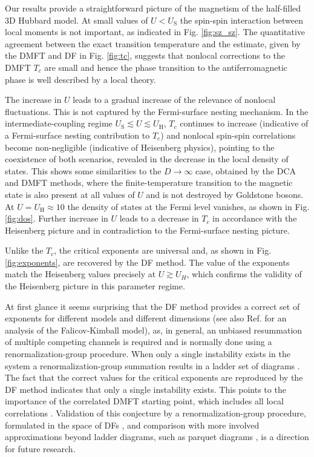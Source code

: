 \documentclass[aps,prb,twocolumn,amsmath,notitlepage,floatfix,footinbib,superscriptaddress,showpacs, showkeys]{revtex4-1}
\begin{document}
Our results provide a straightforward picture of the magnetism of the half-filled 3D Hubbard model. 
At small values of $U < U_\text{S}$ the spin-spin interaction between local moments is not important, as indicated in Fig. \ref{fig:sz_sz}. 
The quantitative agreement between the exact transition temperature and the estimate, given by the DMFT and DF in Fig. \ref{fig:tc}, suggests that nonlocal corrections to the DMFT $T_c$ are small and hence the phase transition to the antiferromagnetic phase is well described by a local theory. 

The increase in $U$ leads to a gradual increase of the relevance of nonlocal fluctuations. 
This is not captured by the Fermi-surface nesting mechanism. 
In the intermediate-coupling regime $U_\text{S} \lesssim U \lesssim U_\text{H}$, $T_c$ continues to increase (indicative of a Fermi-surface nesting contribution to $T_c$) and nonlocal spin-spin correlations become non-negligible (indicative of Heisenberg physics), pointing to the coexistence of both scenarios, revealed in the decrease in the local density of states.
This shows some similarities to the $D\to\infty$ case, obtained by the DCA \cite{Gull2008c} and DMFT \cite{Taranto2012} methods, where the finite-temperature transition to the magnetic state is also present at all values of $U$ and is not destroyed by Goldstone bosons.
At $U = U_\text{H} \approx 10$ the density of states at the Fermi level vanishes, as shown in Fig. \ref{fig:dos}. 
Further increase in $U$ leads to a decrease in $T_c$ in accordance with the Heisenberg picture and in contradiction to the Fermi-surface nesting picture. 

Unlike the $T_c$, the critical exponents are universal and, as shown in Fig. \ref{fig:exponents}, are recovered by the DF method. 
The value of the exponents match the Heisenberg values precisely at $U \gtrsim U_H$, which confirms the validity of the Heisenberg picture in this parameter regime. 

At first glance it seems surprising that the DF method provides a correct set of exponents for different models and different dimensions (see also Ref.  for an analysis of the Falicov-Kimball model), as, in general, an unbiased resummation of multiple competing channels is required and is normally done using a renormalization-group procedure. 
When only a single instability exists in the system a renormalization-group summation results in a ladder set of diagrams \cite{Giamarchi2003}. 
The fact that the correct values for the critical exponents are reproduced by the DF method indicates that only a single instability exists. 
This points to the importance of the correlated DMFT starting point, which includes all local correlations \cite{Zlatic1990,Metzner1989}. 
Validation of this conjecture by a renormalization-group procedure, formulated in the space of DFs \cite{Wentzell2015}, and comparison with more involved approximations beyond ladder diagrams, such as parquet diagrams \cite{Bickers1992,Bickers1991a,Jarrell2009,Jarrell2011}, is a direction for future research.
\end{document}
